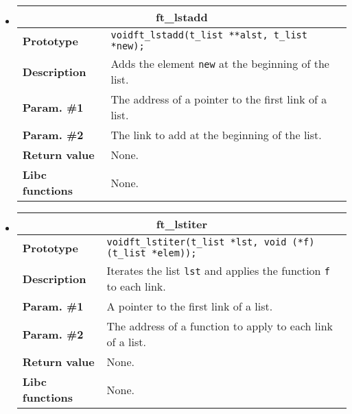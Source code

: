 \documentclass{42-en}
\begin{document}
\begin{itemize}
            \item \begin{tabular}{|l|p{11cm}|}
                \hline
                \multicolumn{2}{|c|}{\textbf{ft\_lstadd}}\\
                \hline
                \textbf{Prototype} &
                \texttt{void\hspace{5mm}ft\_lstadd(t\_list **alst,
                  t\_list *new);}\\
                \hline
                \textbf{Description} & Adds the element \texttt{new}
                at the beginning of the list.\\
                \hline
                \textbf{Param. \#1} & The address of a pointer to the
                first link of a list.\\
                \hline
                \textbf{Param. \#2} & The link to add at the beginning
                of the list.\\
                \hline
                \textbf{Return value} & None.\\
                \hline
                \textbf{Libc functions} & None.\\
                \hline
            \end{tabular}

            \item \begin{tabular}{|l|p{11cm}|}
                \hline
                \multicolumn{2}{|c|}{\textbf{ft\_lstiter}}\\
                \hline
                \textbf{Prototype} &
                \texttt{void\hspace{5mm}ft\_lstiter(t\_list *lst,
                  void (*f)(t\_list *elem));}\\
                \hline
                \textbf{Description} & Iterates the list \texttt{lst}
                and applies the function \texttt{f} to each link.\\
                \hline
                \textbf{Param. \#1} & A pointer to the
                first link of a list.\\
                \hline
                \textbf{Param. \#2} & The address of a function to
                apply to each link of a list.\\
                \hline
                \textbf{Return value} & None.\\
                \hline
                \textbf{Libc functions} & None.\\
                \hline
            \end{tabular}


\end{itemize}
\end{document}
